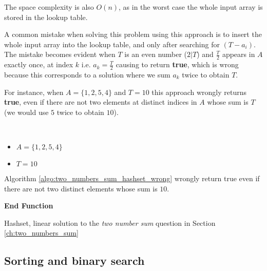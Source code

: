 The space complexity
is also $O(n)$, as in the worst case the whole input array is stored in the lookup table.

A common mistake when solving this problem using this approach is to insert the whole input array into the lookup table, and only after searching for $(T-a_i)$.
The mistake becomes evident when $T$ is an even number ($2 | T$) and $\frac{T}{2}$ appears in $A$  exactly once, at index $k$ i.e. $a_k = \frac{T}{2}$ causing  to return \textbf{true}, which is wrong because this corresponds to a solution where we sum $a_k$ twice to obtain $T$.

For instance, when $A=\{1,2,5,4\}$ and $T=10$ this approach wrongly returns \textbf{true}, even if there are not two elements at distinct indices in $A$ whose sum is $T$ (we would use $5$ twice to obtain $10$).
\begin{example}
	\hfill \\ 
	\begin{itemize}
		\item[] $A=\{1,2,5,4\}$
	\item[] $T = 10$
\end{itemize}
	Algorithm \ref{algo:two_numbers_sum_hashset_wrong} wrongly return true even if there are not two
	distinct elements whose sum is $10$.
\end{example}


\begin{algorithm}
	 
	   
	
	 \textbf{End Function}
		\caption{Hashset, linear solution to the \textit{two number sum} question in Section
		\label{algo:two_numbers_sum_hashset_wrong}
	\ref{ch:two_numbers_sum} }
\end{algorithm}


\subsection{Sorting and binary search}
\label{sect:two_number_problem_binary_search}

